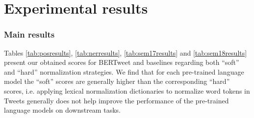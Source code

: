 \documentclass[11pt,a4paper]{article}
\begin{document}
\begin{table}[!t]
    \centering
{}
    \caption{Performance scores on the SemEval2018-Task3A test set. F\textsubscript{1}$^{\text{pos}}$---the main ranking metric---denotes the F\textsubscript{1} score computed for the positive label.}
    \label{tab:sem18results}
\end{table}
 
 
 \section{Experimental results}\label{sec:results}
 
\subsubsection*{Main results} 


Tables \ref{tab:posresults}, \ref{tab:nerresults}, \ref{tab:sem17results} and \ref{tab:sem18results} present our obtained scores for  BERTweet and baselines regarding  both ``soft'' and ``hard'' normalization strategies. 
We find that for each pre-trained language model the ``soft'' scores are generally higher than the corresponding ``hard'' scores, i.e. applying lexical normalization dictionaries to normalize word tokens in Tweets generally does not help improve the performance of the pre-trained language models on downstream tasks. 
\end{document}
